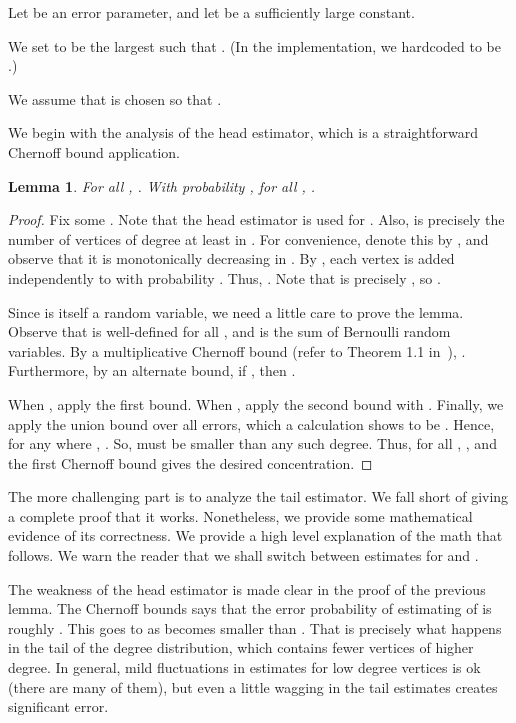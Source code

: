\documentclass[11pt]{article}
\newtheorem{lemma}[theorem]{Lemma}
\theoremstyle{definition}
\begin{document}
Let  be an error parameter, and let  be a sufficiently large constant.
\begin{asparaitem}
    \item We set  to be the largest  such that .
    (In the implementation, we hardcoded  to be .)
    \item We assume that  is chosen so that .
\end{asparaitem}

\medskip

We begin with the analysis of the head estimator, which is a straightforward Chernoff bound application.

\begin{lemma} \label{lem:head} For all , .
With probability , for all , .
\end{lemma}

\begin{proof} Fix some . Note that the head estimator
is used for . Also,  is precisely the number of vertices of degree at least  in .
For convenience, denote this by , and observe that it is monotonically decreasing in .
By , each vertex is added independently to  with probability .
Thus, .
Note that  is precisely , so .

Since  is itself a random variable, we need a little care to prove the lemma.
Observe that  is well-defined for all , and is the sum of Bernoulli random
variables. By a multiplicative Chernoff bound (refer to Theorem 1.1 in~\cite{DuPa}), .
Furthermore, by an alternate bound, if , then .

When , apply the first bound.
When , apply the second bound with .
Finally, we apply the union bound over all errors, which a calculation shows to be .
Hence, for any  where , .
So,  must be smaller than any such degree. Thus, for all ,
, and the first Chernoff bound gives the desired
concentration.
\end{proof}

The more challenging part is to analyze the tail estimator. We fall short of giving a complete
proof that it works. Nonetheless, we provide
some mathematical evidence of its correctness. We provide a high level explanation
of the math that follows. We warn the reader that we shall switch between estimates for 
and .

The weakness of the head estimator is made clear in the proof of the previous lemma.
The Chernoff bounds says that the error probability of estimating of  is roughly .
This goes to  as  becomes smaller than . That is precisely what happens
in the tail of the degree distribution, which contains fewer vertices of higher degree.
In general, mild fluctuations in estimates for low degree vertices is ok (there are many of them),
but even a little wagging in the tail estimates creates significant error.
\end{document}
